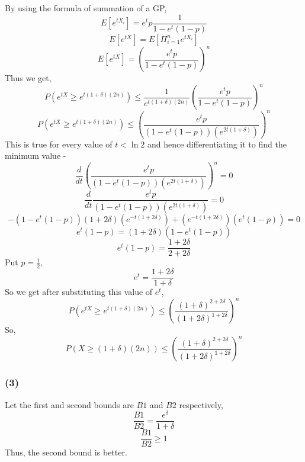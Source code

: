 \documentclass[a4paper]{article}
\begin{document}
By using the formula of summation of a GP,
$$E[e^{tX_i}] = e^tp\frac{1}{1 - e^t(1-p)}$$
$$E[e^{tX}] = E[\Pi_{i=1}^ne^{tX_i}]$$
$$E[e^{tX}] = \left(\frac{e^tp}{1 - e^t(1-p)}\right)^n$$
Thus we get,
$$P(e^{tX} \geq e^{t(1+\delta)(2n)}) \leq \frac{1}{e^{t(1+\delta)(2n)}}\left(\frac{e^tp}{1 - e^t(1-p)}\right)^n$$
$$P(e^{tX} \geq e^{t(1+\delta)(2n)}) \leq \left(\frac{e^tp}{(1 - e^t(1-p))(e^{2t(1+\delta)})}\right)^n$$
This is true for every value of $t < \ln 2$ and hence differentiating it to find the minimum value - 
$$\frac{d}{dt}\left(\frac{e^tp}{(1 - e^t(1-p))(e^{2t(1+\delta)})}\right)^n = 0$$
$$\frac{d}{dt}\frac{e^tp}{(1 - e^t(1-p))(e^{2t(1+\delta)})} = 0$$
$$-(1-e^t(1-p))(1+2\delta)(e^{-t(1+2\delta)}) + (e^{-t(1+2\delta)})(e^t(1-p)) = 0$$
$$e^t(1-p) = (1+2\delta)(1-e^t(1-p))$$
$$e^t(1-p) = \frac{1+2\delta}{2+2\delta}$$
Put $p=\frac{1}{2}$,
$$e^t = \frac{1+2\delta}{1+\delta}$$
So we get after substituting this value of $e^t$,
$$P(e^{tX} \geq e^{t(1+\delta)(2n)}) \leq \left(\frac{(1+\delta)^{2+2\delta}}{(1+2\delta)^{1+2\delta}}\right)^n$$
So, $$P({X} \geq {(1+\delta)(2n)}) \leq \left(\frac{(1+\delta)^{2+2\delta}}{(1+2\delta)^{1+2\delta}}\right)^n$$

\subsubsection*{(3)}
Let the first and second bounds are $B1$ and $B2$ respectively,
$$\frac{B1}{B2} = \frac{e^\delta}{1+\delta}$$
$$\frac{B1}{B2} \geq 1$$
Thus, the second bound is better.
\end{document}
